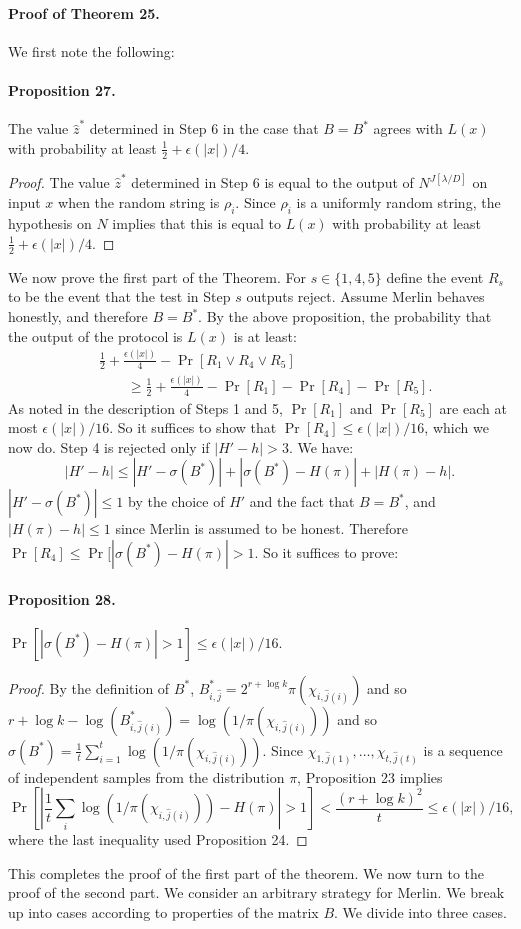 \documentclass[10pt,a4paper]{article}
\begin{document}
\paragraph{Proof of Theorem 25.} We first note the following:
\paragraph{Proposition 27.} The value $\hat z^*$ determined in Step 6 in the case that $B=B^*$ agrees with $L(x)$ with probability at least $\frac12+\epsilon(|x|)/4$.
\begin{proof}The value $\hat z^*$ determined in Step 6 is equal to the output of $N^{J[\lambda/D]}$ on input $x$ when the random string is $\rho_{\hat i}$. Since $\rho_{\hat i}$ is a uniformly random string, the hypothesis on $N$ implies that this is equal to $L(x)$ with probability at least $\frac12+\epsilon(|x|)/4$.\end{proof}
We now prove the first part of the Theorem. For $s\in\{1,4,5\}$ define the event $R_s$ to be the event that the test in Step $s$ outputs reject. Assume Merlin behaves honestly, and therefore $B=B^*$. By the above proposition, the probability that the output of the protocol is $L(x)$ is at least:
\begin{align*}
&\frac12+\frac{\epsilon(|x|)}4-\Pr[R_1\lor R_4\lor R_5]\\
&\qquad\ge\frac12+\frac{\epsilon(|x|)}4-\Pr[R_1]-\Pr[R_4]-\Pr[R_5].
\end{align*}
As noted in the description of Steps 1 and 5, $\Pr[R_1]$ and $\Pr[R_5]$ are each at most $\epsilon(|x|)/16$. So it suffices to show that $\Pr[R_4]\le\epsilon(|x|)/16$, which we now do. Step 4 is rejected only if $|H'-h|>3$. We have:
\[|H'-h|\le|H'-\sigma(B^*)|+|\sigma(B^*)-H(\pi)|+|H(\pi)-h|.\]
$|H'-\sigma(B^*)|\le1$ by the choice of $H'$ and the fact that $B=B^*$, and $|H(\pi)-h|\le1$ since Merlin is assumed to be honest. Therefore $\Pr[R_4]\le\Pr[|\sigma(B^*)-H(\pi)|>1$. So it suffices to prove:
\paragraph{Proposition 28.} $\Pr[|\sigma(B^*)-H(\pi)|>1]\le\epsilon(|x|)/16$.
\begin{proof}By the definition of $B^*$, $B^*_{i,\hat j}=2^{r+\log k}\pi(\chi_{i,\hat j(i)})$ and so $r+\log k-\log(B^*_{i,\hat j(i)})=\log(1/\pi(\chi_{i,\hat j(i)}))$ and so $\sigma(B^*)=\frac1t\sum_{i=1}^t\log(1/\pi(\chi_{i,\hat j(i)}))$. Since $\chi_{1,\hat j(1)},\ldots,\chi_{t,\hat j(t)}$ is a sequence of independent samples from the distribution $\pi$, Proposition 23 implies
\[\Pr\left[\left|\frac1t\sum_i\log(1/\pi(\chi_{i,\hat j(i)}))-H(\pi)\right|>1\right]<\frac{(r+\log k)^2}t\le\epsilon(|x|)/16,\]
where the last inequality used Proposition 24.\end{proof}
This completes the proof of the first part of the theorem. We now turn to the proof of the second part. We consider an arbitrary strategy for Merlin. We break up into cases according to properties of the matrix $B$. We divide into three cases.
\end{document}
